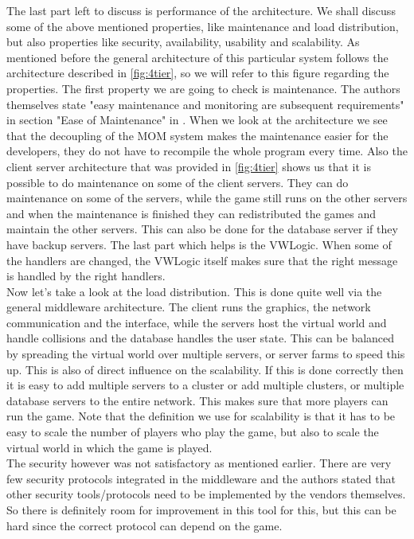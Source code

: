 The last part left to discuss is performance of the architecture. We shall discuss some of the above mentioned properties, like maintenance and load distribution, but also properties like security, availability, usability and scalability. As mentioned before the general architecture of this particular system follows the architecture described in \autoref{fig:4tier}, so we will refer to this figure regarding the properties. The first property we are going to check is maintenance. The authors themselves state "easy maintenance and monitoring are subsequent requirements" in section "Ease of Maintenance" in \cite{middleware}. When we look at the architecture we see that the decoupling of the MOM system makes the maintenance easier for the developers, they do not have to recompile the whole program every time. Also the client server architecture that was provided in \autoref{fig:4tier} shows us that it is possible to do maintenance on some of the client servers. They can do maintenance on some of the servers, while the game still runs on the other servers and when the maintenance is finished they can redistributed the games and maintain the other servers. This can also be done for the database server if they have backup servers. The last part which helps is the VWLogic. When some of the handlers are changed, the VWLogic itself makes sure that the right message is handled by the right handlers. \\
\indent Now let's take a look at the load distribution. This is done quite well via the general middleware architecture. The client runs the graphics, the network communication and the interface, while the servers host the virtual world and handle collisions and the database handles the user state. This can be balanced by spreading the virtual world over multiple servers, or server farms to speed this up. This is also of direct influence on the scalability. If this is done correctly then it is easy to add multiple servers to a cluster or add multiple clusters, or multiple database servers to the entire network. This makes sure that more players can run the game. Note that the definition we use for scalability is that it has to be easy to scale the number of players who play the game, but also to scale the virtual world in which the game is played.\\
\indent The security however was not satisfactory as mentioned earlier. There are very few security protocols integrated in the middleware and the authors stated that other security tools/protocols need to be implemented by the vendors themselves. So there is definitely room for improvement in this tool for this, but this can be hard since the correct protocol can depend on the game.\\
